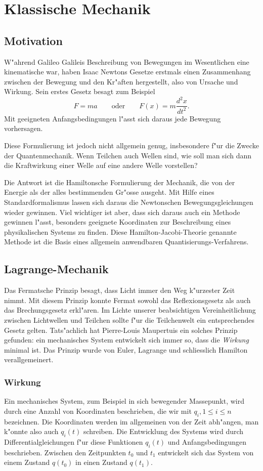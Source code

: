 \chapter{Klassische Mechanik\label{chapter:mechanik}}
\rhead{}
\section{Motivation}
W"ahrend Galileo Galileis Beschreibung von Bewegungen im Wesentlichen
eine kinematische war, haben Isaac
Newtons Gesetze erstmals einen Zusammenhang zwischen
der Bewegung und den Kr"aften hergestellt, also von Ursache und
Wirkung. Sein erstes Gesetz besagt zum Beispiel
\[
F=ma\qquad\text{oder}\qquad
F(x)=m\frac{d^2x}{dt^2}.
\]
Mit geeigneten Anfangsbedingungen l"asst sich daraus jede Bewegung 
vorhersagen.

Diese Formulierung ist jedoch nicht allgemein genug, insbesondere f"ur die
Zwecke der Quantenmechanik. Wenn Teilchen auch Wellen sind, wie soll man
sich dann die Kraftwirkung einer Welle auf eine andere Welle vorstellen?

Die Antwort ist die Hamiltonsche Formulierung der Mechanik, die von der
Energie als der alles bestimmenden Gr"osse ausgeht.
Mit Hilfe eines Standardformalismus lassen sich daraus die Newtonschen
Bewegungsgleichungen wieder gewinnen.
Viel wichtiger ist aber, dass sich daraus auch ein Methode gewinnen
l"asst, besonders geeignete Koordinaten zur Beschreibung eines
physikalischen Systems zu finden.
Diese Hamilton-Jacobi-Theorie genannte Methode ist die Basis eines
allgemein anwendbaren Quantisierungs-Verfahrens.

\section{Lagrange-Mechanik}
Das Fermatsche Prinzip besagt, dass Licht immer den Weg k"urzester Zeit
nimmt. Mit diesem Prinzip konnte Fermat sowohl das Reflexionsgesetz als
auch das Brechungsgesetz erkl"aren.
Im Lichte unserer beabsichtigen Vereinheitlichung zwischen Lichtwellen
und Teilchen sollte f"ur die Teilchenwelt ein entsprechendes Gesetz
gelten. Tats"achlich hat Pierre-Louis Maupertuis ein solches Prinzip
gefunden: ein mechanisches System entwickelt sich immer so, dass die
{\em Wirkung} minimal ist. Das Prinzip wurde von Euler, Lagrange 
und schliesslich Hamilton verallgemeinert.
\subsection{Wirkung}
Ein mechanisches System, zum Beispiel in sich bewegender Massepunkt,
wird durch eine Anzahl von Koordinaten beschrieben, die wir mit
$q_i,1\le i\le n$ bezeichnen. Die Koordinaten werden im allgemeinen 
von der Zeit abh"angen, man k"onnte also auch $q_i(t)$ schreiben.
Die Entwicklung des Systems wird durch Differentialgleichungen 
f"ur diese Funktionen $q_i(t)$ und Anfangsbedingungen beschrieben.
Zwischen den Zeitpunkten $t_0$ und $t_1$ entwickelt sich das
System
von einem Zustand $q(t_0)$ in einen Zustand $q(t_1)$.

